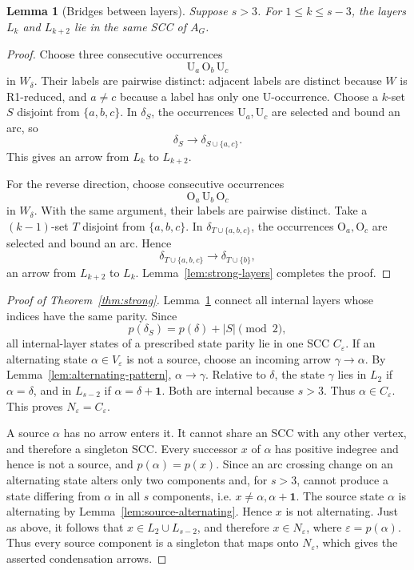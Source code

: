 \documentclass[11pt]{amsart}
\newtheorem{lemma}[theorem]{Lemma}
\theoremstyle{definition}
\theoremstyle{remark}
\newcommand{\one}{\mathbf 1}
\begin{document}
\begin{lemma}[Bridges between layers]\label{lem:layer-bridges}
Suppose \(s>3\).  For \(1\le k\le s-3\), the layers \(L_k\) and
\(L_{k+2}\) lie in the same SCC of \(A_G\).
\end{lemma}

\begin{proof}
Choose three consecutive occurrences
\[
  \mathrm U_a\,\mathrm O_b\,\mathrm U_c
\]
in \(W_\delta\).  Their labels are pairwise distinct: adjacent labels are
distinct because \(W\) is R1-reduced, and \(a\ne c\) because a label has
only one \(\mathrm U\)-occurrence.  Choose a \(k\)-set \(S\) disjoint
from \(\{a,b,c\}\).  In \(\delta_S\), the occurrences
\(\mathrm U_a,\mathrm U_c\) are selected and bound an arc, so
\[
  \delta_S\longrightarrow\delta_{S\cup\{a,c\}}.
\]
This gives an arrow from \(L_k\) to \(L_{k+2}\).

For the reverse direction, choose consecutive occurrences
\[
  \mathrm O_a\,\mathrm U_b\,\mathrm O_c
\] in  \(W_\delta\). With the same argument, their labels are pairwise distinct.
Take a \((k-1)\)-set \(T\) disjoint from \(\{a,b,c\}\).  In
\(\delta_{T\cup\{a,b,c\}}\), the occurrences
\(\mathrm O_a,\mathrm O_c\) are selected and bound an arc.  Hence
\[
  \delta_{T\cup\{a,b,c\}}
  \longrightarrow
  \delta_{T\cup\{b\}},
\]
an arrow from \(L_{k+2}\) to \(L_k\).  Lemma~\ref{lem:strong-layers}
completes the proof.
\end{proof}

\begin{proof}[Proof of Theorem~\ref{thm:strong}]
Lemma~\ref{lem:layer-bridges} connect all internal layers whose indices have the same
parity.  Since
\[
  p(\delta_S)=p(\delta)+|S|\pmod2,
\]
all internal-layer states of a prescribed state parity lie in one SCC
\(C_\varepsilon\).
If an alternating state \(\alpha\in V_\varepsilon\) is not a source, choose
an incoming arrow \(\gamma\to\alpha\).  By
Lemma~\ref{lem:alternating-pattern}, \(\alpha\to\gamma\).  Relative to
\(\delta\), the state \(\gamma\) lies in \(L_2\) if \(\alpha=\delta\), and
in \(L_{s-2}\) if \(\alpha=\delta+\one\).  Both are internal because
\(s>3\).  Thus \(\alpha\in C_\varepsilon\).  This proves
\(N_\varepsilon=C_\varepsilon\).

A source $\alpha$ has no arrow
enters it.  It cannot share an SCC with any other vertex, and therefore a
singleton SCC.
Every successor \(x\) of $\alpha$ has positive indegree and hence is not a source, and
\(p(\alpha)=p(x)\).   
Since an arc
crossing change on an alternating state alters only two components and, for
\(s>3\), cannot produce a state differing from \(\alpha\) in all \(s\) components, i.e. $x\neq \alpha, \alpha+\one$. 
The source state $\alpha$  is alternating by
Lemma~\ref{lem:source-alternating}. Hence \(x\) is not alternating.
Just as above, it follows that \(x\in L_2\cup L_{s-2}\), and therefore
\(x\in N_\varepsilon\), where \(\varepsilon=p(\alpha)\).  Thus every source component is a singleton that
maps onto \(N_\varepsilon\), which gives the asserted condensation arrows.

\end{proof}
\end{document}
